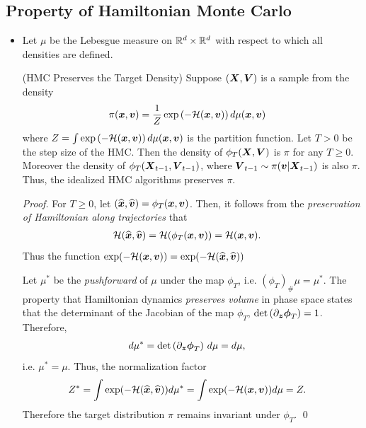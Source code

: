 \documentclass[11pt]{article}
\begin{document}
\subsection{Property of Hamiltonian Monte Carlo}
\begin{itemize}
\item Let $\mu$ be the Lebesgue measure on ${\mathbb R}^d \times {\mathbb R}^d$ with respect to which all densities are defined.
\begin{theorem} (HMC Preserves the Target Density) \citep{vishnoi2021introduction}
Suppose $(\boldsymbol{X}, \boldsymbol{V})$ is a sample from the density
\begin{align*}
\pi(\boldsymbol{x}, \boldsymbol{v}) &= \frac{1}{Z}\exp\left(-{\mathcal H}(\boldsymbol{x}, \boldsymbol{v})\right)d\mu(\boldsymbol{x}, \boldsymbol{v})
\end{align*} where $Z = \int \exp\left(-{\mathcal H}(\boldsymbol{x}, \boldsymbol{v})\right)d\mu(\boldsymbol{x}, \boldsymbol{v})$ is the partition function. Let $T > 0$ be the step size of the HMC. Then the density of $\phi_T(\boldsymbol{X}, \boldsymbol{V})$ is $\pi$ for any $T \ge 0$. Moreover the density of $\phi_T(\boldsymbol{X}_{t-1}, \boldsymbol{V}_{t-1})$, where $\boldsymbol{V}_{t-1} \sim \pi(\boldsymbol{v}|\boldsymbol{X}_{t-1})$ is also $\pi$. Thus, the idealized HMC algorithms preserves $\pi$.
\end{theorem}
\begin{proof}
For $T \ge 0$, let $(\widehat{\boldsymbol{x}}, \widehat{\boldsymbol{v}}) = \phi_T(\boldsymbol{x}, \boldsymbol{v})$. Then, it follows from the \emph{preservation of Hamiltonian along trajectories} that
\begin{align*}
{\mathcal H}(\widehat{\boldsymbol{x}}, \widehat{\boldsymbol{v}}) = {\mathcal H}(\phi_T(\boldsymbol{x}, \boldsymbol{v}))  &= {\mathcal H}(\boldsymbol{x}, \boldsymbol{v}).
\end{align*}
Thus the function $\exp(-{\mathcal H}(\boldsymbol{x}, \boldsymbol{v})) = \exp(-{\mathcal H}(\widehat{\boldsymbol{x}}, \widehat{\boldsymbol{v}}))$

Let $\mu^{*}$ be the \emph{pushforward} of $\mu$ under the map $\phi_{T}$, i.e. $(\phi_{T})_{\#}\mu = \mu^{*}$. The property that Hamiltonian dynamics \emph{preserves volume} in phase space states that the determinant of the Jacobian of the map $\phi_{T}$, $\det\left(\partial_{\boldsymbol{z}}\boldsymbol{\phi}_T\right) = 1$.
Therefore, 
\begin{align*}
 d\mu^{*} &= \det\left(\partial_{\boldsymbol{z}}\boldsymbol{\phi}_T\right)\,d\mu= d\mu, 
\end{align*} i.e. $\mu^{*} = \mu$. Thus, the normalization factor
\begin{align*}
Z^{*}=  \int \exp(-{\mathcal H}(\widehat{\boldsymbol{x}}, \widehat{\boldsymbol{v}}))d\mu^{*} &=  \int \exp(-{\mathcal H}(\boldsymbol{x}, \boldsymbol{v}))d\mu = Z.
\end{align*} Therefore the target distribution $\pi$ remains invariant under $\phi_{T}$. \qed
\end{proof}
\end{itemize}
\end{document}
